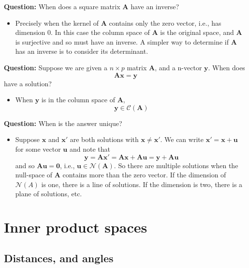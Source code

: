 \documentclass[
]{book}
\providecommand{\tightlist}{%
  \setlength{\itemsep}{0pt}\setlength{\parskip}{0pt}}
\theoremstyle{definition}
\theoremstyle{definition}
\theoremstyle{definition}
\theoremstyle{definition}
\theoremstyle{remark}
\begin{document}
\textbf{Question:} When does a square matrix \(\mathbf A\) have an inverse?

\begin{itemize}
\tightlist
\item
  Precisely when the kernel of \(\mathbf A\) contains only the zero vector, i.e., has dimension 0. In this case the column space of \(\mathbf A\) is the original space, and \(\mathbf A\) is surjective and so must have an inverse. A simpler way to determine if \(\mathbf A\) has an inverse is to consider its determinant.
\end{itemize}

\textbf{Question:} Suppose we are given a \(n\times p\) matrix \(\mathbf A\), and a n-vector \(\mathbf y\). When does
\[\mathbf A\mathbf x= \mathbf y\]
have a solution?

\begin{itemize}
\tightlist
\item
  When \(\mathbf y\) is in the column space of \(\mathbf A\),
  \[\mathbf y\in \mathcal{C}(\mathbf A)\]
\end{itemize}

\textbf{Question:} When is the answer unique?

\begin{itemize}
\tightlist
\item
  Suppose \(\mathbf x\) and \(\mathbf x'\) are both solutions with \(\mathbf x\not =\mathbf x'\). We can write \(\mathbf x'=\mathbf x+\mathbf u\) for some vector \(\mathbf u\) and note that
  \[\mathbf y=\mathbf A\mathbf x' = \mathbf A\mathbf x+\mathbf A\mathbf u= \mathbf y+\mathbf A\mathbf u\]
  and so \(\mathbf A\mathbf u={\boldsymbol 0}\), i.e., \(\mathbf u\in \mathcal{N}(\mathbf A)\). So there are multiple solutions when the null-space of \(\mathbf A\) contains more than the zero vector. If the dimension of \(\mathcal{N}(A)\) is one, there is a line of solutions. If the dimension is two, there is a plane of solutions, etc.
\end{itemize}

\section{Inner product spaces}\label{linalg-innerprod}

\subsection{Distances, and angles}\label{normed}
\end{document}
